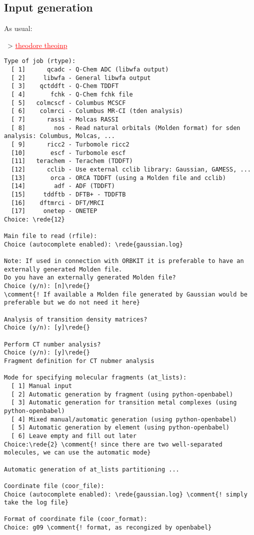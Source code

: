\documentclass[DIV=12,headings=normal]{scrartcl}
\newcommand{\comment}[1]{\textcolor{blue}{#1}}
\newcommand{\redl}[1]{{\textcolor{red}{\underline{#1}}}}
\newcommand{\rede}[1]{\redl{#1 <ENTER>}}
\newcommand{\comm}[1]{
\small
~> \redl{#1}
\normalsize
}
\newcounter{number}
\begin{document}
\subsection{Input generation}
As usual:

\comm{theodore theoinp}

\scriptsize
\begin{Verbatim}[commandchars=\\\{\}]
Type of job (rtype):
  [ 1]      qcadc - Q-Chem ADC (libwfa output)
  [ 2]     libwfa - General libwfa output
  [ 3]    qctddft - Q-Chem TDDFT
  [ 4]       fchk - Q-Chem fchk file
  [ 5]   colmcscf - Columbus MCSCF
  [ 6]    colmrci - Columbus MR-CI (tden analysis)
  [ 7]      rassi - Molcas RASSI
  [ 8]        nos - Read natural orbitals (Molden format) for sden analysis: Columbus, Molcas, ...
  [ 9]      ricc2 - Turbomole ricc2
  [10]       escf - Turbomole escf
  [11]   terachem - Terachem (TDDFT)
  [12]      cclib - Use external cclib library: Gaussian, GAMESS, ...
  [13]       orca - ORCA TDDFT (using a Molden file and cclib)
  [14]        adf - ADF (TDDFT)
  [15]     tddftb - DFTB+ - TDDFTB
  [16]    dftmrci - DFT/MRCI
  [17]     onetep - ONETEP
Choice: \rede{12}

Main file to read (rfile):
Choice (autocomplete enabled): \rede{gaussian.log}

Note: If used in connection with ORBKIT it is preferable to have an externally generated Molden file.
Do you have an externally generated Molden file?
Choice (y/n): [n]\rede{}
\comment{! If available a Molden file generated by Gaussian would be preferable but we do not need it here}

Analysis of transition density matrices?
Choice (y/n): [y]\rede{}

Perform CT number analysis?
Choice (y/n): [y]\rede{}
Fragment definition for CT nubmer analysis

Mode for specifying molecular fragments (at_lists):
  [ 1] Manual input
  [ 2] Automatic generation by fragment (using python-openbabel)
  [ 3] Automatic generation for transition metal complexes (using python-openbabel)
  [ 4] Mixed manual/automatic generation (using python-openbabel)
  [ 5] Automatic generation by element (using python-openbabel)
  [ 6] Leave empty and fill out later
Choice:\rede{2} \comment{! since there are two well-separated molecules, we can use the automatic mode}

Automatic generation of at_lists partitioning ...

Coordinate file (coor_file):
Choice (autocomplete enabled): \rede{gaussian.log} \comment{! simply take the log file}

Format of coordinate file (coor_format):
Choice: g09 \comment{! format, as recongized by openbabel}
\end{Verbatim}
\normalsize
\end{document}
